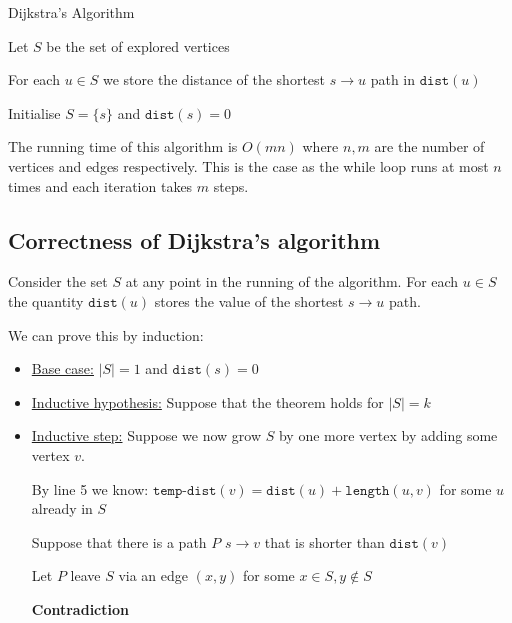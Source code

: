 \documentclass{article}
\begin{document}
\begin{algorithm}
  \caption{Dijkstra's Algorithm}
  Let $S$ be the set of explored vertices

  For each $u \in S$ we store the distance of the shortest $s \rightarrow u$ path in $\texttt{dist}(u)$

  Initialise $S= \{ s \} $ and $\texttt{dist}(s) = 0 $

\end{algorithm}


The running time of this algorithm is $O(mn)$ where $n,m$ are the number of vertices and edges respectively. This is the case as the while loop runs at most $n$ times and each iteration takes $m$ steps.

\subsection{Correctness of Dijkstra's algorithm}

\begin{theorem}
Consider the set $S$ at any point in the running of the algorithm. For each $u \in S$ the quantity $\texttt{dist} (u)$ stores the value of the shortest $s \rightarrow u$ path.
\end{theorem}

We can prove this by induction:

\begin{itemize}
  \item \underline{Base case:} $|S| =1$ and $\texttt{dist}(s) =0 $

  \item \underline{Inductive hypothesis:} Suppose that the theorem holds for $|S| = k$
  \item \underline{Inductive step:} Suppose we now grow $S$ by one more vertex by adding some vertex $v$.

        By line 5 we know: $\texttt{temp-dist}(v) = \texttt{dist}(u) + \texttt{length}(u,v)   $ for some $u$ already in $S$

        Suppose that there is a path $P$ $s \rightarrow v$ that is shorter than $\texttt{dist}(v) $

        Let $P$ leave $S$ via an edge $(x,y)$ for some $x\in S, y \notin S$

        \textbf{Contradiction}
\end{itemize}
\end{document}
